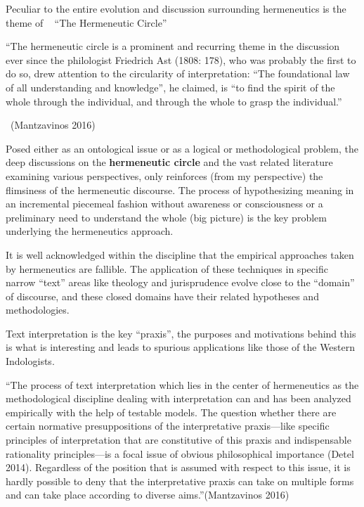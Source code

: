 Peculiar to the entire evolution and discussion surrounding hermeneutics is the theme of   “The Hermeneutic Circle”

\begin{myquote}
“The hermeneutic circle is a prominent and recurring theme in the discussion ever since the philologist Friedrich Ast (1808: 178), who was probably the first to do so, drew attention to the circularity of interpretation: “The foundational law of all understanding and knowledge”, he claimed, is “to find the spirit of the whole through the individual, and through the whole to grasp the individual.”

~\hfill (Mantzavinos 2016)
\end{myquote}

Posed either as an ontological issue or as a logical or methodological problem, the deep discussions on the \textbf{hermeneutic circle} and the vast related literature examining various perspectives, only reinforces (from my perspective) the flimsiness of the hermeneutic discourse. The process of hypothesizing meaning in an incremental piecemeal fashion without awareness or consciousness or a preliminary need to understand the whole (big picture) is the key problem underlying the hermeneutics approach.

It is well acknowledged within the discipline that the empirical approaches taken by hermeneutics are fallible. The application of these techniques in specific narrow “text” areas like theology and jurisprudence evolve close to the “domain” of discourse, and these closed domains have their related hypotheses and methodologies.

Text interpretation is the key “praxis”, the purposes and motivations behind this is what is interesting and leads to spurious applications like those of the Western Indologists.

\begin{myquote}
“The process of text interpretation which lies in the center of hermeneutics as the methodological discipline dealing with interpretation can and has been analyzed empirically with the help of testable models. The question whether there are certain normative presuppositions of the interpretative praxis—like specific principles of interpretation that are constitutive of this praxis and indispensable rationality principles—is a focal issue of obvious philosophical importance (Detel 2014). Regardless of the position that is assumed with respect to this issue, it is hardly possible to deny that the interpretative praxis can take on multiple forms and can take place according to diverse aims.”\hfill (Mantzavinos 2016)
\end{myquote}

